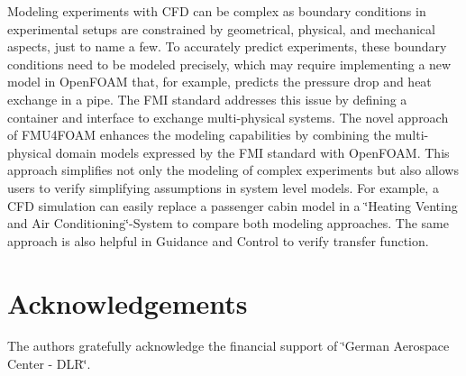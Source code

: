Modeling experiments with C\+FD can be complex as boundary conditions in experimental setups are constrained by geometrical, physical, and mechanical aspects, just to name a few. To accurately predict experiments, these boundary conditions need to be modeled precisely, which may require implementing a new model in Open\+F\+O\+AM that, for example, predicts the pressure drop and heat exchange in a pipe. The F\+MI standard addresses this issue by defining a container and interface to exchange multi-\/physical systems. The novel approach of F\+M\+U4\+F\+O\+AM enhances the modeling capabilities by combining the multi-\/physical domain models expressed by the F\+MI standard with Open\+F\+O\+AM. This approach simplifies not only the modeling of complex experiments but also allows users to verify simplifying assumptions in system level models. For example, a C\+FD simulation can easily replace a passenger cabin model in a \char`\"{}\+Heating Venting and Air Conditioning\char`\"{}-\/\+System to compare both modeling approaches. The same approach is also helpful in Guidance and Control to verify transfer function.

\section*{Acknowledgements}

The authors gratefully acknowledge the financial support of \char`\"{}\+German Aerospace Center -\/ D\+L\+R\char`\"{}. 